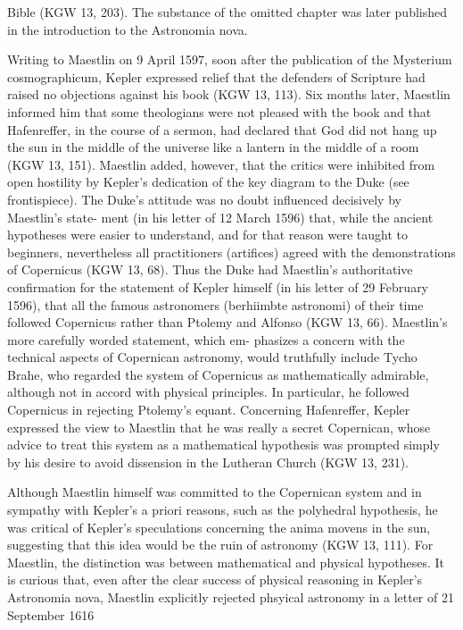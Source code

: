 \documentclass{article}
\begin{document}
Bible (KGW 13, 203). The substance of the omitted chapter was later
published in the introduction to the Astronomia nova.

Writing to Maestlin on 9 April 1597, soon after the publication of the
Mysterium cosmographicum, Kepler expressed relief that the defenders
of Scripture had raised no objections against his book (KGW 13, 113). Six
months later, Maestlin informed him that some theologians were not
pleased with the book and that Hafenreffer, in the course of a sermon,
had declared that God did not hang up the sun in the middle of the
universe like a lantern in the middle of a room (KGW 13, 151). Maestlin
added, however, that the critics were inhibited from open hostility by
Kepler’s dedication of the key diagram to the Duke (see frontispiece). The
Duke’s attitude was no doubt influenced decisively by Maestlin’s state-
ment (in his letter of 12 March 1596) that, while the ancient hypotheses
were easier to understand, and for that reason were taught to beginners,
nevertheless all practitioners (artifices) agreed with the demonstrations of
Copernicus (KGW 13, 68). Thus the Duke had Maestlin’s authoritative
confirmation for the statement of Kepler himself (in his letter of 29
February 1596), that all the famous astronomers (berhiimbte astronomi)
of their time followed Copernicus rather than Ptolemy and Alfonso
(KGW 13, 66). Maestlin’s more carefully worded statement, which em-
phasizes a concern with the technical aspects of Copernican astronomy,
would truthfully include Tycho Brahe, who regarded the system of
Copernicus as mathematically admirable, although not in accord with
physical principles. In particular, he followed Copernicus in rejecting
Ptolemy’s equant. Concerning Hafenreffer, Kepler expressed the view to
Maestlin that he was really a secret Copernican, whose advice to treat this
system as a mathematical hypothesis was prompted simply by his desire to
avoid dissension in the Lutheran Church (KGW 13, 231).

Although Maestlin himself was committed to the Copernican system
and in sympathy with Kepler’s a priori reasons, such as the polyhedral
hypothesis, he was critical of Kepler’s speculations concerning the anima
movens in the sun, suggesting that this idea would be the ruin of
astronomy (KGW 13, 111). For Maestlin, the distinction was between
mathematical and physical hypotheses. It is curious that, even after the
clear success of physical reasoning in Kepler’s Astronomia nova, Maestlin
explicitly rejected phsyical astronomy in a letter of 21 September 1616
\end{document}
